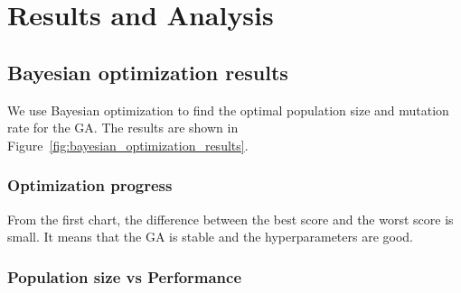 \section{Results and Analysis}
\label{sec:results-analysis}




\subsection{Bayesian optimization results}

We use Bayesian optimization to find the optimal population size and mutation rate for the GA. The results are shown in Figure~\ref{fig:bayesian_optimization_results}.

\subsubsection{Optimization progress}

From the first chart, the difference between the best score and the worst score is small. It means that the GA is stable and the hyperparameters are good.

\subsubsection{Population size vs Performance}

